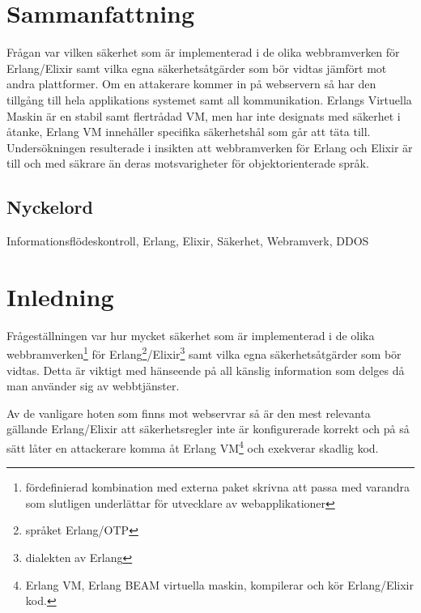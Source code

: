 \documentclass[12pt]{article}
\begin{document}
\maketitle

	 	 	 	 	
	
\section*{Sammanfattning}
Frågan var vilken säkerhet som är implementerad i de olika webbramverken för Erlang/Elixir samt vilka egna säkerhetsåtgärder som bör vidtas jämfört mot andra plattformer.
Om en attakerare kommer in på webservern så har den tillgång till hela applikations systemet samt all kommunikation.
Erlangs Virtuella Maskin är en stabil samt flertrådad VM, men har inte designats med säkerhet i åtanke, Erlang VM innehåller specifika säkerhetshål som går att täta till.
Undersökningen resulterade i insikten att webbramverken för Erlang och Elixir är till och med säkrare än deras motsvarigheter för objektorienterade språk.

\subsection*{Nyckelord}
Informationsflödeskontroll, Erlang, Elixir, Säkerhet, Webramverk, DDOS
	
\section{Inledning}

Frågeställningen var hur mycket säkerhet som är implementerad i de olika webbramverken\footnote{fördefinierad kombination med externa paket skrivna att passa med varandra som slutligen underlättar för utvecklare av webapplikationer} för Erlang\footnote{språket Erlang/OTP\cite{erlang}}/Elixir\footnote{dialekten av Erlang\cite{elixir}} samt vilka egna säkerhetsåtgärder som bör vidtas.
Detta är viktigt med hänseende på all känslig information som delges då man använder sig av webbtjänster.

Av de vanligare hoten som finns mot webservrar så är den mest relevanta gällande Erlang/Elixir att säkerhetsregler inte är konfigurerade korrekt och på så sätt låter en attackerare komma åt Erlang VM\footnote{Erlang VM, Erlang BEAM virtuella maskin, kompilerar och kör Erlang/Elixir kod\cite{erlang}.} och exekverar skadlig kod. 
\end{document}
